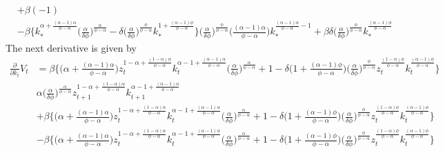 \documentclass[a4paper]{article}
\theoremstyle{definition}
\begin{document}
\begin{align*}
												&+ \beta (-1) \\
												&- \beta \Big\{ k_{*}^{\alpha+\frac{(\alpha-1)\alpha}{\phi-\alpha}} \Big( \frac{\alpha}{\delta\phi} \Big)^{\frac{\alpha}{\phi-\alpha}} - \delta \Big( \frac{\alpha}{\delta\phi} \Big)^{\frac{\phi}{\phi-\alpha}}k_{*}^{1+\frac{(\alpha-1)\phi}{\phi-\alpha}} \Big\} \Big( \frac{\alpha}{\delta\phi} \Big)^{\frac{\phi}{\phi-\alpha}} \Big( \frac{(\alpha-1)\alpha}{\phi-\alpha} \Big)k_{*}^{\frac{(\alpha-1)\alpha}{\phi-\alpha}-1} + \beta \delta \Big( \frac{\alpha}{\delta\phi} \Big)^{\frac{\phi}{\phi-\alpha}}k_{*}^{\frac{(\alpha-1)\phi}{\phi-\alpha}}
	\end{align*}
The next derivative is given by
	\begin{align*}
	\frac{\partial}{\partial k_t}V_t 		&= \beta \Big\{ \Big( {\alpha+\frac{(\alpha-1)\alpha}{\phi-\alpha}} \Big) z_{t}^{1-\alpha+\frac{(1-\alpha)\alpha}{\phi-\alpha}} k_{t}^{\alpha-1+\frac{(\alpha-1)\alpha}{\phi-\alpha}} \Big( \frac{\alpha}{\delta\phi} \Big)^{\frac{\alpha}{\phi-\alpha}} + 1 - \delta \Big( {1+\frac{(\alpha-1)\phi}{\phi-\alpha}} \Big) \Big( \frac{\alpha}{\delta\phi} \Big)^{\frac{\phi}{\phi-\alpha}}z_{t}^{\frac{(1-\alpha)\phi}{\phi-\alpha}}k_{t}^{\frac{(\alpha-1)\phi}{\phi-\alpha}} \Big\} \\
												& \alpha \Big( \frac{\alpha}{\delta\phi} \Big)^{\frac{\alpha}{\phi-\alpha}}z_{t+1}^{1-\alpha+\frac{(1-\alpha)\alpha}{\phi-\alpha}}k_{t+1}^{\alpha-1+\frac{(\alpha-1)\alpha}{\phi-\alpha}} \\
												&+ \beta \Big\{ \Big( {\alpha+\frac{(\alpha-1)\alpha}{\phi-\alpha}} \Big) z_{t}^{1-\alpha+\frac{(1-\alpha)\alpha}{\phi-\alpha}} k_{t}^{\alpha-1+\frac{(\alpha-1)\alpha}{\phi-\alpha}} \Big( \frac{\alpha}{\delta\phi} \Big)^{\frac{\alpha}{\phi-\alpha}} + 1 - \delta \Big( {1+\frac{(\alpha-1)\phi}{\phi-\alpha}} \Big) \Big( \frac{\alpha}{\delta\phi} \Big)^{\frac{\phi}{\phi-\alpha}}z_{t}^{\frac{(1-\alpha)\phi}{\phi-\alpha}}k_{t}^{\frac{(\alpha-1)\phi}{\phi-\alpha}} \Big\} \\
												&- \beta \Big\{ \Big( {\alpha+\frac{(\alpha-1)\alpha}{\phi-\alpha}} \Big) z_{t}^{1-\alpha+\frac{(1-\alpha)\alpha}{\phi-\alpha}} k_{t}^{\alpha-1+\frac{(\alpha-1)\alpha}{\phi-\alpha}} \Big( \frac{\alpha}{\delta\phi} \Big)^{\frac{\alpha}{\phi-\alpha}} + 1 - \delta \Big( {1+\frac{(\alpha-1)\phi}{\phi-\alpha}} \Big) \Big( \frac{\alpha}{\delta\phi} \Big)^{\frac{\phi}{\phi-\alpha}}z_{t}^{\frac{(1-\alpha)\phi}{\phi-\alpha}}k_{t}^{\frac{(\alpha-1)\phi}{\phi-\alpha}} \Big\}\\

\end{align*}
\end{document}
